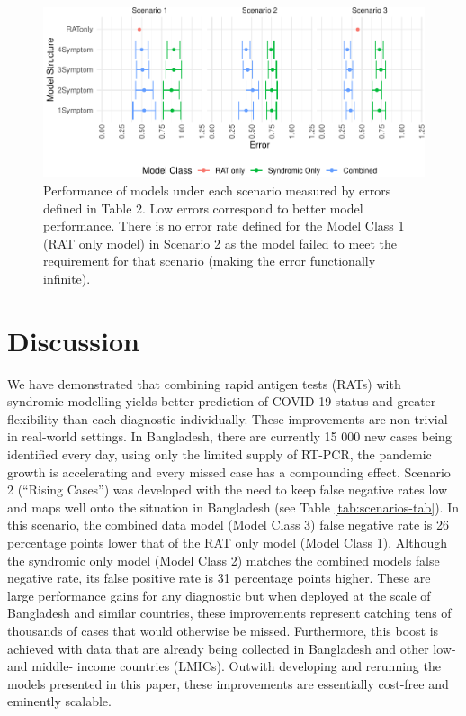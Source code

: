\documentclass[]{elsarticle} %
\begin{document}
\begin{figure}
\centering
\includegraphics{0501_MainText_files/figure-latex/scenario-plot-1.pdf}
\caption{\label{fig:scenario-plot}Performance of models under each scenario measured by errors defined in Table 2. Low errors correspond to better model performance. There is no error rate defined for the Model Class 1 (RAT only model) in Scenario 2 as the model failed to meet the requirement for that scenario (making the error functionally infinite).}
\end{figure}

\hypertarget{discussion}{%
\section{Discussion}\label{discussion}}

We have demonstrated that combining rapid antigen tests (RATs) with syndromic modelling yields better prediction of COVID-19 status and greater flexibility than each diagnostic individually.
These improvements are non-trivial in real-world settings.
In Bangladesh, there are currently 15 000 new cases being identified every day, using only the limited supply of RT-PCR, the pandemic growth is accelerating and every missed case has a compounding effect.
Scenario 2 (``Rising Cases'') was developed with the need to keep false negative rates low and maps well onto the situation in Bangladesh (see Table \ref{tab:scenarios-tab}).
In this scenario, the combined data model (Model Class 3) false negative rate is
26 percentage points lower that of the RAT only model (Model Class 1).
Although the syndromic only model (Model Class 2) matches the combined models false negative rate, its false positive rate is
31 percentage points higher.
These are large performance gains for any diagnostic but when deployed at the scale of Bangladesh and similar countries, these improvements represent catching tens of thousands of cases that would otherwise be missed.
Furthermore, this boost is achieved with data that are already being collected in Bangladesh and other low- and middle- income countries (LMICs).
Outwith developing and rerunning the models presented in this paper, these improvements are essentially cost-free and eminently scalable.
\end{document}
